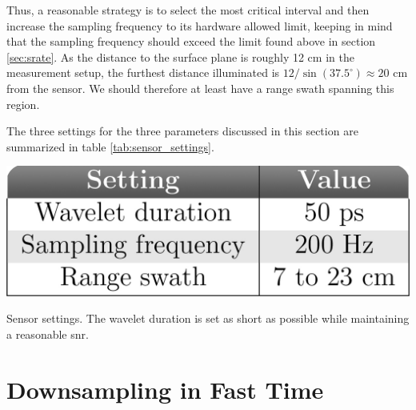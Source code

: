 Thus, a reasonable strategy is to select the most critical interval and then increase the sampling frequency to its hardware allowed limit, keeping in mind that the sampling frequency should exceed the limit found above in section \ref{sec:srate}. As the distance to the surface plane is roughly 12 cm in the measurement setup, the furthest distance illuminated is $12/\sin(37.5^\circ)\approx 20$ cm from the sensor. We should therefore at least have a range swath spanning this region. 

The three settings for the three parameters discussed in this section are summarized in table \ref{tab:sensor_settings}.

\begin{table}
	\begin{center}
		\includegraphics[scale=0.70]{figs_temp/table_settings.jpg}
	\end{center}
	\caption{Sensor settings. The wavelet duration is set as short as possible while maintaining a reasonable \gls{snr}.}
	\label{tab:sensor_settings}
\end{table}

\section{Downsampling in Fast Time}
\label{downsampling}

